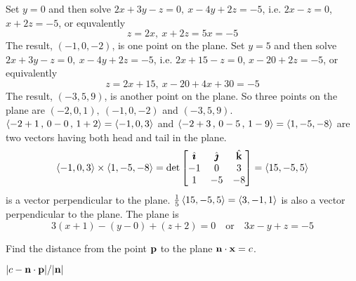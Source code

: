 \begin{solution}
Set $y=0$ and then solve $2x+3y-z=0,\ x-4y+2z=-5$, i.e.
$2x-z=0$, $x+2z=-5$, or equvalently
\begin{equation*}
z=2x,\ x+2z=5x=-5
\end{equation*} 
The result, $(-1,0,-2)$, is one point on the plane. Set $y=5$ and then 
solve $2x+3y-z=0,\ x-4y+2z=-5$, i.e. $2x+15-z=0$, $x-20+2z=-5$,
or equivalently
\begin{equation*}
z=2x+15,\ x-20+4x+30=-5
\end{equation*}
The result, $(-3,5,9)$, is another 
point on the plane. So three points on the plane are $(-2,0,1),
\ (-1,0,-2)$ and $(-3,5,9)$. 
$\left< -2+1\,,\,0-0\,,\, 1+2 \right>=\left< -1,0,3\right>$ and 
$\left< -2+3\,,\,0-5\,,\, 1-9 \right> = \left< 1,-5,-8\right>$ are two 
vectors having both head and tail in the plane. 
\begin{align*}
\left< -1,0,3\right> \times  \left< 1,-5,-8\right>
=\det\left[\begin{matrix}
           \hat{\pmb{\imath}} & \hat{\pmb{\jmath}} & \hat{\mathbf{k}} \\
           -1  &  0  &  3 \\
            1  &  -5 &  -8
  \end{matrix}\right]
=\left< 15 , -5 ,5  \right>
\end{align*}
is a vector perpendicular to the plane.
$\frac{1}{5}\left< 15 , -5 ,5  \right>=\left< 3,-1,1\right>$
is also a vector perpendicular to the plane. The plane is
\begin{equation*}
3(x+1) -(y-0) + (z+2)=0\quad\text{or}\quad
3x-y+z=-5
\end{equation*}
\end{solution}

\begin{question}
Find the distance from the point $\mathbf{p}$ to the plane $\mathbf{n}\cdot 
\mathbf{x}= c$.
\end{question}


\begin{answer}
$|c-\mathbf{n}\cdot\mathbf{p}|/|\mathbf{n}|$
\end{answer}

